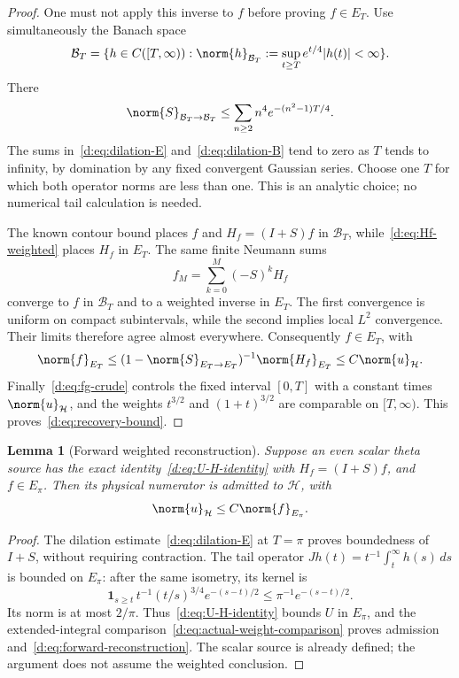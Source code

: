 \documentclass[11pt,a4paper]{article}
\numberwithin{equation}{section}
\newtheorem{lemma}[theorem]{Lemma}
\theoremstyle{definition}\newtheorem{definition}[theorem]{Definition}
\theoremstyle{remark}\newtheorem{remark}[theorem]{Remark}
\newcommand{\Hh}{\mathcal H}\newcommand{\Hw}{\mathcal H}
\begin{document}
\begin{proof}
One must not apply this inverse to $f$ before proving $f\in E_T$. Use simultaneously the Banach space
\[
 \mathcal B_T=\{h\in C([T,\infty)):
       \norm{h}_{\mathcal B_T}:=\sup_{t\ge T}e^{t/4}|h(t)|<\infty\}.
\]
There
\begin{equation}\label{d:eq:dilation-B}
 \norm{S}_{\mathcal B_T\to\mathcal B_T}
 \le\sum_{n\ge2}n^4e^{-(n^2-1)T/4}.
\end{equation}
The sums in~\eqref{d:eq:dilation-E} and~\eqref{d:eq:dilation-B} tend to zero as $T$ tends to infinity, by domination by any fixed convergent Gaussian series. Choose one $T$ for which both operator norms are less than one. This is an analytic choice; no numerical tail calculation is needed.

The known contour bound places $f$ and $H_f=(I+S)f$ in $\mathcal B_T$, while~\eqref{d:eq:Hf-weighted} places $H_f$ in $E_T$. The same finite Neumann sums
\[
 f_M=\sum_{k=0}^M(-S)^kH_f
\]
converge to $f$ in $\mathcal B_T$ and to a weighted inverse in $E_T$. The first convergence is uniform on compact subintervals, while the second implies local $L^2$ convergence. Their limits therefore agree almost everywhere. Consequently $f\in E_T$, with
\[
 \norm{f}_{E_T}\le
 (1-\norm{S}_{E_T\to E_T})^{-1}\norm{H_f}_{E_T}
 \le C\norm{u}_{\Hh}.
\]
Finally~\eqref{d:eq:fg-crude} controls the fixed interval $[0,T]$ with a constant times $\norm{u}_{\Hh}$, and the weights $t^{3/2}$ and $(1+t)^{3/2}$ are comparable on $[T,\infty)$. This proves~\eqref{d:eq:recovery-bound}.
\end{proof}

\begin{lemma}[Forward weighted reconstruction]\label{d:lem:forward-reconstruction}
Suppose an even scalar theta source has the exact identity~\eqref{d:eq:U-H-identity} with $H_f=(I+S)f$, and $f\in E_\pi$. Then its physical numerator is admitted to $\Hh$, with
\begin{equation}\label{d:eq:forward-reconstruction}
 \norm{u}_{\Hh}\le C\norm{f}_{E_\pi}.
\end{equation}
\end{lemma}
\begin{proof}
The dilation estimate~\eqref{d:eq:dilation-E} at $T=\pi$ proves boundedness of $I+S$, without requiring contraction. The tail operator
$Jh(t)=t^{-1}\int_t^\infty h(s)\,ds$ is bounded on $E_\pi$: after the same isometry, its kernel is
\[
 \boldsymbol1_{s\ge t}\,t^{-1}(t/s)^{3/4}e^{-(s-t)/2}
 \le\pi^{-1}e^{-(s-t)/2}.
\]
Its norm is at most $2/\pi$. Thus~\eqref{d:eq:U-H-identity} bounds $U$ in $E_\pi$, and the extended-integral comparison~\eqref{d:eq:actual-weight-comparison} proves admission and~\eqref{d:eq:forward-reconstruction}. The scalar source is already defined; the argument does not assume the weighted conclusion.
\end{proof}
\end{document}

